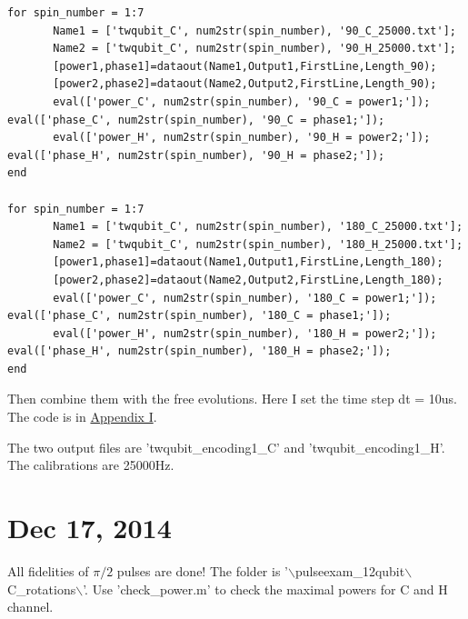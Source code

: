 \documentclass[prl,onecolumn]{revtex4-1}
\newcommand{\dir}{$\backslash$}
\begin{document}
\begin{lstlisting}
for spin_number = 1:7
       Name1 = ['twqubit_C', num2str(spin_number), '90_C_25000.txt'];
       Name2 = ['twqubit_C', num2str(spin_number), '90_H_25000.txt'];
       [power1,phase1]=dataout(Name1,Output1,FirstLine,Length_90);
       [power2,phase2]=dataout(Name2,Output2,FirstLine,Length_90);
       eval(['power_C', num2str(spin_number), '90_C = power1;']); eval(['phase_C', num2str(spin_number), '90_C = phase1;']);
       eval(['power_H', num2str(spin_number), '90_H = power2;']); eval(['phase_H', num2str(spin_number), '90_H = phase2;']);
end

for spin_number = 1:7
       Name1 = ['twqubit_C', num2str(spin_number), '180_C_25000.txt'];
       Name2 = ['twqubit_C', num2str(spin_number), '180_H_25000.txt'];
       [power1,phase1]=dataout(Name1,Output1,FirstLine,Length_180);
       [power2,phase2]=dataout(Name2,Output2,FirstLine,Length_180);
       eval(['power_C', num2str(spin_number), '180_C = power1;']); eval(['phase_C', num2str(spin_number), '180_C = phase1;']);
       eval(['power_H', num2str(spin_number), '180_H = power2;']); eval(['phase_H', num2str(spin_number), '180_H = phase2;']);
end
\end{lstlisting}

Then combine them with the free evolutions. Here I set the time step dt = 10us. The code is in \hyperlink{code:combine_encoding1}{Appendix I}.

The two output files are 'twqubit\_encoding1\_C' and 'twqubit\_encoding1\_H'. The calibrations are 25000Hz.

\newpage
\section{Dec 17, 2014}

All fidelities of $\pi/2$ pulses are done! The folder is '\dir pulseexam\_12qubit\dir C\_rotations\dir'. Use 'check\_power.m' to check the maximal powers for C and H channel.
\end{document}
